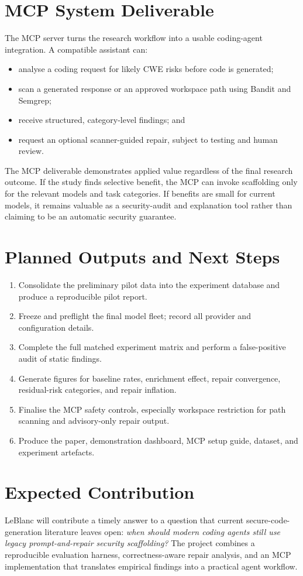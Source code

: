 \documentclass[11pt,a4paper]{article}
\begin{document}
\section{MCP System Deliverable}
The MCP server turns the research workflow into a usable coding-agent integration. A compatible assistant can:
\begin{itemize}
\item analyse a coding request for likely CWE risks before code is generated;
\item scan a generated response or an approved workspace path using Bandit and Semgrep;
\item receive structured, category-level findings; and
\item request an optional scanner-guided repair, subject to testing and human review.
\end{itemize}
The MCP deliverable demonstrates applied value regardless of the final research outcome. If the study finds selective benefit, the MCP can invoke scaffolding only for the relevant models and task categories. If benefits are small for current models, it remains valuable as a security-audit and explanation tool rather than claiming to be an automatic security guarantee.

\section{Planned Outputs and Next Steps}
\begin{enumerate}
\item Consolidate the preliminary pilot data into the experiment database and produce a reproducible pilot report.
\item Freeze and preflight the final model fleet; record all provider and configuration details.
\item Complete the full matched experiment matrix and perform a false-positive audit of static findings.
\item Generate figures for baseline rates, enrichment effect, repair convergence, residual-risk categories, and repair inflation.
\item Finalise the MCP safety controls, especially workspace restriction for path scanning and advisory-only repair output.
\item Produce the paper, demonstration dashboard, MCP setup guide, dataset, and experiment artefacts.
\end{enumerate}

\section{Expected Contribution}
LeBlanc will contribute a timely answer to a question that current secure-code-generation literature leaves open: \emph{when should modern coding agents still use legacy prompt-and-repair security scaffolding?} The project combines a reproducible evaluation harness, correctness-aware repair analysis, and an MCP implementation that translates empirical findings into a practical agent workflow.
\end{document}
